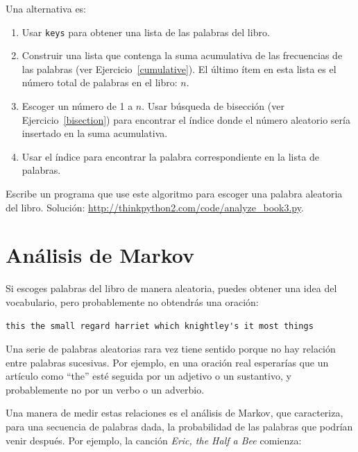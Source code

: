 \documentclass[10pt]{book}
\begin{document}
Una alternativa es:

\begin{enumerate}

\item Usar {\tt keys} para obtener una lista de las palabras del libro.

\item Construir una lista que contenga la suma acumulativa de las frecuencias
  de las palabras (ver Ejercicio~\ref{cumulative}).  El último ítem
  en esta lista es el número total de palabras en el libro: $n$.

\item Escoger un número de 1 a $n$.  Usar búsqueda de bisección
  (ver Ejercicio~\ref{bisection}) para encontrar el índice donde el número
  aleatorio sería insertado en la suma acumulativa.

\item Usar el índice para encontrar la palabra correspondiente en la lista de palabras.

\end{enumerate}

\begin{exercise}
\label{randhist}

Escribe un programa que use este algoritmo para escoger una palabra aleatoria del
libro.  Solución:
\url{http://thinkpython2.com/code/analyze_book3.py}.

\end{exercise}



\section{Análisis de Markov}
\label{markov}

Si escoges palabras del libro de manera aleatoria, puedes obtener una
idea del vocabulario, pero probablemente no obtendrás una oración:

\begin{verbatim}
this the small regard harriet which knightley's it most things
\end{verbatim}
%
Una serie de palabras aleatorias rara vez tiene sentido porque
no hay relación entre palabras sucesivas.  Por ejemplo, en
una oración real esperarías que un artículo como ``the'' esté
seguida por un adjetivo o un sustantivo, y probablemente no por un verbo
o un adverbio.

Una manera de medir estas relaciones es el análisis de
Markov, que
caracteriza, para una secuencia de palabras dada, la probabilidad de las
palabras que podrían venir después.  Por ejemplo, la canción {\em Eric, the Half a
  Bee} comienza:
\end{document}
